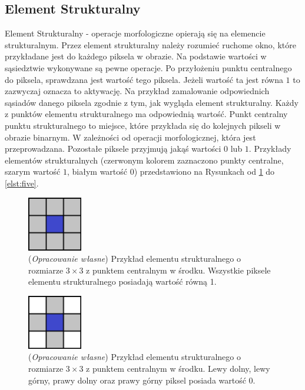\documentclass{article}
\begin{document}
        \subsection{Element Strukturalny}
        {
            \label{sec:element-strukturalny}
            \Large
            \justifying
            \quad
            Element Strukturalny - operacje morfologiczne opierają się na elemencie strukturalnym.
            Przez element strukturalny należy rozumieć ruchome okno, które przykładane jest do każdego piksela w obrazie.
            Na podstawie wartości w sąsiedztwie wykonywane są pewne operacje.
            Po przyłożeniu punktu centralnego do piksela, sprawdzana jest wartość tego piksela.
            Jeżeli wartość ta jest równa \(1\) to zazwyczaj oznacza to aktywację.
            Na przykład zamalowanie odpowiednich sąsiadów danego piksela zgodnie z tym, jak wygląda element strukturalny.
            Każdy z punktów elementu strukturalnego ma odpowiednią wartość.
            Punkt centralny punktu strukturalnego to miejsce, które przykłada się do kolejnych pikseli w obrazie binarnym.
            W zależności od operacji morfologicznej, która jest przeprowadzana.
            Pozostałe piksele przyjmują jakąś wartości \(0\) lub \(1\).
            Przykłady elementów strukturalnych (czerwonym kolorem zaznaczono punkty centralne, szarym wartość \(1\), białym wartość \(0\)) przedstawiono na Rysunkach od \ref{elst:one} do \ref{elst:five}.
        }
        \begin{figure}[H]
            \captionsetup{margin=1.5cm}
            \centering
            \includegraphics[width=90px]{element_strukturalny_1.png}
            \caption
            {
                (\textit{Opracowanie własne}) Przykład elementu strukturalnego o rozmiarze \(3 \times 3\) z punktem centralnym w środku.
                Wszystkie piksele elementu strukturalnego posiadają wartość równą 1.
            }
            \label{elst:one}
        \end{figure}

        \begin{figure}[H]
            \captionsetup{margin=1.5cm}
            \centering
            \includegraphics[width=90px]{element_strukturalny_2.png}
            \caption
            {
                (\textit{Opracowanie własne}) Przykład elementu strukturalnego o rozmiarze \(3 \times 3\) z punktem centralnym w środku.
                Lewy dolny, lewy górny, prawy dolny oraz prawy górny piksel posiada wartość 0.
            }
            \label{elst:two}
        \end{figure}
\end{document}
